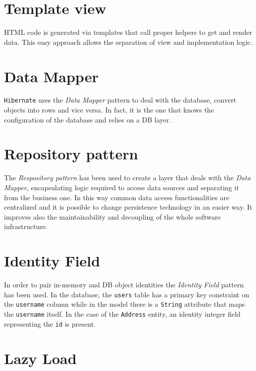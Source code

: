 \documentclass[a4paper]{report}
\begin{document}
	\section{Template view}
	\label{sec:template_view}
	
	HTML code is generated via templates that call proper helpers to get and render data. This easy approach allows the separation of view and implementation logic.
	
	\section{Data Mapper}
	\label{sec:data_mapper}
	
	\texttt{Hibernate} uses the \textit{Data Mapper} pattern to deal with the database, convert objects into rows and vice versa. In fact, it is the one that knows the configuration of the database and relies on a DB layer.
	
	\section{Repository pattern}
	\label{sec:repository_pattern}
	
	The \textit{Respository pattern} has been used to create a layer that deals with the \textit{Data Mapper}, encapsulating logic required to access data sources and separating it from the business one. In this way common data access functionalities are centralized and it is possible to change persistence technology in an easier way. It improves also the maintainability and decoupling of the whole software infrastructure.
	
	\section{Identity Field}
	\label{sec:identity_field}
	
	In order to pair in-memory and DB object identities the \textit{Identity Field} pattern has been used. In the database, the \texttt{users} table has a primary key constraint on the \texttt{username} column while in the model there is a \texttt{String} attribute that maps the \texttt{username} itself. In the case of the \texttt{Address} entity, an identity integer field representing the \texttt{id} is present.
	
	\section{Lazy Load}
	\label{sec:lazy_load}
	
\end{document}
